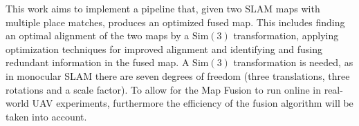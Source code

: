 This work aims to implement a pipeline that, given two SLAM maps with multiple place matches, produces an optimized fused map. This includes finding an optimal alignment of the two maps by a $\text{Sim}(3)$ transformation, applying optimization techniques for improved alignment and identifying and fusing redundant information in the fused map. A $\text{Sim}(3)$ transformation is needed, as in monocular \ac{SLAM} there are seven degrees of freedom (three translations, three rotations and a scale factor). To allow for the Map Fusion to run online in real-world UAV experiments, furthermore the efficiency of the fusion algorithm will be taken into account.




